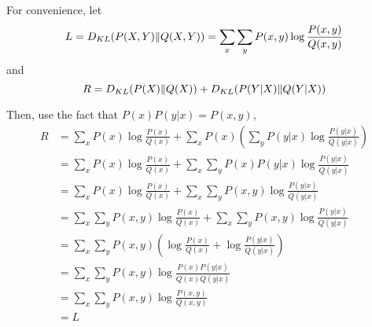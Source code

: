\begin{answer}

For convenience, let 
\begin{equation}
    L = D_{KL}(P(X,Y)\|Q(X,Y)) = \sum_x \sum_y P(x,y) \log\frac{P(x,y)}{Q(x,y)}
\end{equation}
and 
\begin{equation}
    R = D_{KL}(P(X)\|Q(X)) + D_{KL}(P(Y|X)\|Q(Y|X))
\end{equation}

Then, use the fact that $P(x)P(y|x) = P(x,y)$,
\begin{align*}
R &= \sum_x P(x) \log\frac{P(x)}{Q(x)} + \sum_x P(x) \left(\sum_y P(y|x) \log\frac{P(y|x)}{Q(y|x)}\right) \\
&= \sum_x P(x) \log\frac{P(x)}{Q(x)} + \sum_x \sum_y P(x)P(y|x) \log\frac{P(y|x)}{Q(y|x)} \\
&= \sum_x P(x) \log\frac{P(x)}{Q(x)} + \sum_x \sum_y P(x,y) \log\frac{P(y|x)}{Q(y|x)} \\
&= \sum_x \sum_y P(x,y) \log\frac{P(x)}{Q(x)} + \sum_x \sum_y P(x,y) \log\frac{P(y|x)}{Q(y|x)} \\
&= \sum_x \sum_y P(x,y) \left(\log\frac{P(x)}{Q(x)} + \log\frac{P(y|x)}{Q(y|x)}\right) \\
&= \sum_x \sum_y P(x,y) \log\frac{P(x)P(y|x)}{Q(x)Q(y|x)} \\
&= \sum_x \sum_y P(x,y) \log\frac{P(x,y)}{Q(x,y)} \\
&= L
\end{align*}


\end{answer}
